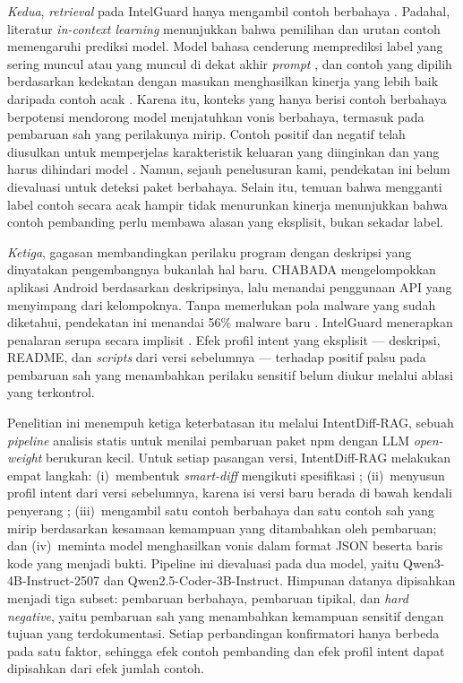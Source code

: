 \documentclass[a4paper,fleqn]{cas-dc}
\begin{document}
\emph{Kedua}, \emph{retrieval} pada IntelGuard hanya mengambil contoh berbahaya
\citep{guo2026bridging}. Padahal, literatur \emph{in-context learning}
menunjukkan bahwa pemilihan dan urutan contoh memengaruhi prediksi model. Model
bahasa cenderung memprediksi label yang sering muncul atau yang muncul di dekat
akhir \emph{prompt} \citep{zhao2021calibrate}, dan contoh yang dipilih
berdasarkan kedekatan dengan masukan menghasilkan kinerja yang lebih baik
daripada contoh acak \citep{liu2022makes}. Karena itu, konteks yang hanya berisi
contoh berbahaya berpotensi mendorong model menjatuhkan vonis berbahaya, termasuk
pada pembaruan sah yang perilakunya mirip. Contoh positif dan negatif telah
diusulkan untuk memperjelas karakteristik keluaran yang diinginkan dan yang
harus dihindari model \citep{gao2024customizing}. Namun, sejauh penelusuran
kami, pendekatan ini belum dievaluasi untuk deteksi paket berbahaya. Selain itu,
temuan bahwa mengganti label contoh secara acak hampir tidak menurunkan kinerja
\citep{min2022rethinking} menunjukkan bahwa contoh pembanding perlu membawa alasan
yang eksplisit, bukan sekadar label.

\emph{Ketiga}, gagasan membandingkan perilaku program dengan deskripsi yang
dinyatakan pengembangnya bukanlah hal baru. CHABADA mengelompokkan aplikasi
Android berdasarkan deskripsinya, lalu menandai penggunaan API yang menyimpang
dari kelompoknya. Tanpa memerlukan pola malware yang sudah diketahui,
pendekatan ini menandai 56\% malware baru \citep{gorla2014checking}. IntelGuard
menerapkan penalaran serupa secara implisit \citep{guo2026bridging}. Efek
profil intent yang eksplisit --- deskripsi, README, dan \emph{scripts} dari
versi sebelumnya --- terhadap positif palsu pada pembaruan sah yang
menambahkan perilaku sensitif belum diukur melalui ablasi yang terkontrol.

Penelitian ini menempuh ketiga keterbatasan itu melalui IntentDiff-RAG,
sebuah \emph{pipeline} analisis statis untuk menilai pembaruan paket npm dengan
LLM \emph{open-weight} berukuran kecil. Untuk setiap pasangan versi,
IntentDiff-RAG melakukan empat langkah:
(i)~membentuk \emph{smart-diff} mengikuti spesifikasi \citet{wyss2025evaluating};
(ii)~menyusun profil intent dari versi sebelumnya, karena isi versi baru berada
di bawah kendali penyerang \citep{wyss2025evaluating};
(iii)~mengambil satu contoh berbahaya dan satu contoh sah yang mirip
berdasarkan kesamaan kemampuan yang ditambahkan oleh pembaruan; dan
(iv)~meminta model menghasilkan vonis dalam format JSON beserta baris kode yang
menjadi bukti. Pipeline ini dievaluasi pada dua model, yaitu
Qwen3-4B-Instruct-2507 dan Qwen2.5-Coder-3B-Instruct. Himpunan datanya
dipisahkan menjadi tiga subset: pembaruan berbahaya, pembaruan tipikal, dan
\emph{hard negative}, yaitu pembaruan sah yang menambahkan kemampuan sensitif
dengan tujuan yang terdokumentasi. Setiap perbandingan konfirmatori hanya
berbeda pada satu faktor, sehingga efek contoh pembanding dan efek profil intent
dapat dipisahkan dari efek jumlah contoh.
\end{document}
